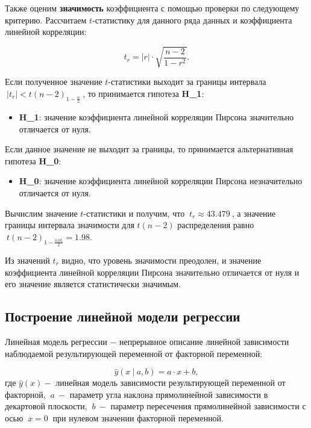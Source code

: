 \documentclass[
]{article}
\providecommand{\tightlist}{%
  \setlength{\itemsep}{0pt}\setlength{\parskip}{0pt}}
\begin{document}
Также оценим \textbf{значимость} коэффициента с помощью проверки по
следующему критерию. Рассчитаем \(t\)-статистику для данного ряда данных
и коэффициента линейной корреляции:

\[
t_r = |r| \cdot \sqrt{\frac{n - 2}{1 - r^2}}.
\]

Если полученное значение \(t\)-статистики выходит за границы интервала
\(\ |t_r| < t(n-2)_{1-\frac{\alpha}{2}}\ \), то принимается гипотеза
\textbf{H\_1}:

\begin{itemize}
\tightlist
\item
  \textbf{H\_1}: значение коэффициента линейной корреляции Пирсона
  значительно отличается от нуля.
\end{itemize}

Если данное значение не выходит за границы, то принимается
альтернативная гипотеза \textbf{H\_0}:

\begin{itemize}
\tightlist
\item
  \textbf{H\_0}: значение коэффициента линейной корреляции Пирсона
  незначительно отличается от нуля.
\end{itemize}

Вычислим значение \(t\)-статистики и получим, что
\(\ t_r \approx 43.479\ \), а значение границы интервала значимости для
\(t(n-2)\) распределения равно \(\ t(n-2)_{1- \frac{0.05}{2}} = 1.98\).

Из значений \(t_r\) видно, что уровень значимости преодолен, и значение
коэффициента линейной корреляции Пирсона значительно отличается от нуля
и его значение является статистически значимым.

\hypertarget{ux43fux43eux441ux442ux440ux43eux435ux43dux438ux435-ux43bux438ux43dux435ux439ux43dux43eux439-ux43cux43eux434ux435ux43bux438-ux440ux435ux433ux440ux435ux441ux441ux438ux438}{%
\subsection{\texorpdfstring{\textbf{Построение линейной модели
регрессии}}{Построение линейной модели регрессии}}\label{ux43fux43eux441ux442ux440ux43eux435ux43dux438ux435-ux43bux438ux43dux435ux439ux43dux43eux439-ux43cux43eux434ux435ux43bux438-ux440ux435ux433ux440ux435ux441ux441ux438ux438}}

Линейная модель регрессии \(-\) непрерывное описание линейной
зависимости наблюдаемой результирующей переменной от факторной
переменной:

\[
\hat{y}(x\ |\ a,b) = a\cdot x + b,
\] где \(\hat{y}(x) -\) линейная модель зависимости результирующей
переменной от факторной, \(\ a\ -\) параметр угла наклона прямолинейной
зависимости в декартовой плоскости, \(\ b\ -\) параметр пересечения
прямолинейной зависимости с осью \(\ x = 0\ \) при нулевом значении
факторной переменной.
\end{document}
